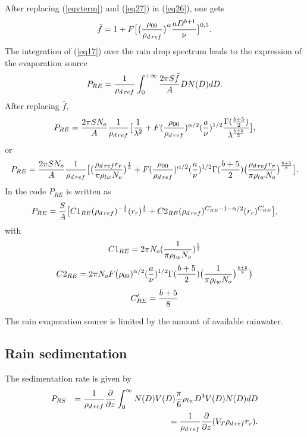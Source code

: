 After replacing (\ref{eqvterm}) and (\ref{eq27}) in (\ref{eq26}), one gets
\begin{equation}
\bar f =  1 + F \big[ \big( {\rho_{00} \over \rho_{d\,ref}} \big) ^\alpha
{aD^{b+1}  \over \nu} \big] ^{0.5}.
\end{equation}
The integration of (\ref{eq17}) over the rain drop spectrum
leads to  the expression of the evaporation source
\begin{equation}
P_{RE} = {1 \over \rho_{d\,ref}}\int_0^{+\infty} {2 \pi S \bar f \over A} D N(D) dD.
\end{equation}
After replacing $\bar f$,
\begin{equation}
P_{RE} = {2 \pi S N_o \over A}{1 \over \rho_{d\,ref}} \big[ {1 \over \lambda ^2}
+ F ( {\rho_{00} \over \rho_{d\,ref}} )^{\alpha /2} ({a  \over \nu})^{1/2}
{\Gamma ({b+5 \over 2}) \over \lambda ^{{b+5 \over 2}}} \big],
\end{equation}
or
\begin{equation}
P_{RE} = {2 \pi S N_o \over A} {1 \over \rho_{d\,ref}} \big[
\big( {\rho_{d\,ref} r_r \over \pi \rho_{lw} N_o}\big) ^{1 \over 2}
+ F ( {\rho_{00} \over \rho_{d\,ref}} )^{\alpha /2} ({a  \over \nu})^{1/2}
\Gamma ({b+5 \over 2})
\big( {\rho_{d\,ref} r_r \over \pi \rho_{lw} N_o}\big) ^{b+5 \over 8} \big].
\end{equation}
In the code $P_{RE}$ is written as
\begin{equation}
P_{RE}= { S \over A}\big [ C1_{RE} (\rho_{d\,ref}) ^{-{1 \over 2}} (r_r) ^{1 \over 2} +
 C2_{RE} (\rho_{d\,ref} ) ^{C'_{RE}-1- \alpha/2} (r_r ) ^{C'_{RE}} \big],
\end{equation}
with
$$C1_{RE}=2 \pi  N_o ( {1 \over \pi \rho_{lw} N_o}) ^{1 \over 2}$$
$$C2_{RE}=2 \pi  N_o  F \big( \rho_{00} )^{\alpha /2} ({a \over \nu})^{1/2}
\Gamma ({b+5 \over 2})
\big( { 1 \over \pi \rho_{lw} N_o}\big) ^{b+5 \over 8} \big)$$
$$C'_{RE}={b+5 \over 8}$$

The rain evaporation source is limited by the amount of available rainwater.

\subsection{Rain sedimentation}
The sedimentation rate is given by
\begin{eqnarray}
&P_{RS} &= {1 \over \rho_{d\,ref}}{\partial \over \partial z} \int_0^\infty N(D)V(D) {\pi \over 6}
\rho_{lw} D^3 V(D)N(D) dD \\
&&= {1 \over \rho_{d\,ref}}{\partial \over \partial z} (V_T \rho_{d\,ref} r_r).
\end{eqnarray}

